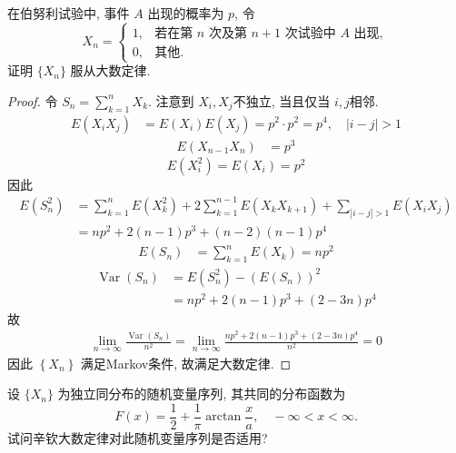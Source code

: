 \documentclass[../main.tex]{subfiles}
\begin{document}
\begin{exercise}{}{}
在伯努利试验中, 事件 $A$ 出现的概率为 $p$, 令
$$ X_n = \begin{cases} 1, & \text{若在第 } n \text{ 次及第 } n+1 \text{ 次试验中 } A \text{ 出现}, \\ 0, & \text{其他}. \end{cases} $$
证明 $\{X_n\}$ 服从大数定律.
\end{exercise}
\begin{proof}
令 $S_{n}= \sum _{k= 1}^{n}X_{k}$. 注意到 $X_{i},X_{j}$不独立, 当且仅当 $i,j$相邻. 
 $$ \begin{aligned} E\left(X_{i}X_{j}\right)&= E\left(X_{i}\right)E\left(X_{j}\right)= p^{2}\cdot p^{2}= p^{4},\quad \left| i-j \right|> 1  \end{aligned} $$
 $$ \begin{aligned} E\left(X_{n-1}X_{n}\right)&= p^{3} \end{aligned} $$  
 $$ E\left(X_{i}^{2}\right)= E\left(X_{i}\right)= p^{2} $$ 
 因此 
 $$ \begin{aligned} E\left(S_{n}^{2}\right)&= \sum _{k= 1}^{n}E\left(X_{k}^{2}\right)+ 2\sum _{k= 1}^{n-1}E\left(X_{k}X_{k+ 1}\right)+ \sum _{\left| i-j \right|> 1 }E\left(X_{i}X_{j}\right)\\&=  np^{2}+ 2\left(n-1\right)p^{3}+ \left(n-2\right)\left(n-1\right)p^{4}\end{aligned} $$ 
 $$ \begin{aligned} E\left(S_{n}\right)&= \sum _{k= 1}^{n}E\left(X_{k}\right)= np^{2} \end{aligned} $$
 $$ \begin{aligned} \operatorname{Var}\left(S_{n}\right)&= E\left(S_{n}^{2}\right)-\left(E\left(S_{n}\right)\right)^{2}\\&= np^{2}+ 2\left(n-1\right)p^{3}+ \left(2-3n\right)p^{4} \end{aligned} $$
故 
 $$ \begin{aligned} \lim_{n\to \infty}\frac{\operatorname{Var}\left(S_{n}\right) }{n^{2} }= \lim_{n\to \infty}\frac{ np^{2}+ 2\left(n-1\right)p^{3}+ \left(2-3n\right)p^{4}}{ n^{2}} = 0\end{aligned} $$
因此 $\left\{ X_{n} \right\}$   满足Markov条件, 故满足大数定律.
\end{proof}
\begin{exercise}{}{}
设 $\{X_n\}$ 为独立同分布的随机变量序列, 其共同的分布函数为
$$F(x) = \frac{1}{2} + \frac{1}{\pi}\operatorname{arctan}\frac{x}{a}, \quad -\infty < x < \infty.$$
试问辛钦大数定律对此随机变量序列是否适用?
\end{exercise}
\end{document}
